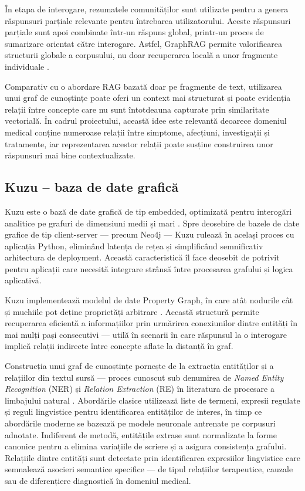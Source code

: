 \documentclass[12pt, a4paper, oneside, romanian]{teza-upb}
\begin{document}
În etapa de interogare, rezumatele comunităților sunt utilizate pentru a genera răspunsuri parțiale relevante pentru întrebarea utilizatorului. Aceste răspunsuri parțiale sunt apoi combinate într-un răspuns global, printr-un proces de sumarizare orientat către interogare. Astfel, GraphRAG permite valorificarea structurii globale a corpusului, nu doar recuperarea locală a unor fragmente individuale \cite{edge2024local}.

Comparativ cu o abordare RAG bazată doar pe fragmente de text, utilizarea unui graf de cunoștințe poate oferi un context mai structurat și poate evidenția relații între concepte care nu sunt întotdeauna capturate prin similaritate vectorială. În cadrul proiectului, această idee este relevantă deoarece domeniul medical conține numeroase relații între simptome, afecțiuni, investigații și tratamente, iar reprezentarea acestor relații poate susține construirea unor răspunsuri mai bine contextualizate.

\subsection{Kuzu -- baza de date grafică}

Kuzu este o bază de date grafică de tip embedded, optimizată pentru interogări analitice pe grafuri de dimensiuni medii și mari \cite{kuzu_doc}. Spre deosebire de bazele de date grafice de tip client-server — precum Neo4j — Kuzu rulează în același proces cu aplicația Python, eliminând latența de rețea și simplificând semnificativ arhitectura de deployment. Această caracteristică îl face deosebit de potrivit pentru aplicații care necesită integrare strânsă între procesarea grafului și logica aplicativă.


Kuzu implementează modelul de date Property Graph, în care atât nodurile cât 
și muchiile pot deține proprietăți arbitrare \cite{kuzu_doc, kuzu_cidr}. 
Această structură permite recuperarea eficientă a informațiilor prin urmărirea 
conexiunilor dintre entități în mai mulți pași consecutivi — utilă în scenarii 
în care răspunsul la o interogare implică relații indirecte între concepte 
aflate la distanță în graf.


Construcția unui graf de cunoștințe pornește de la extracția entităților și a 
relațiilor din textul sursă — proces cunoscut sub denumirea de 
\textit{Named Entity Recognition} (NER) și \textit{Relation Extraction} (RE) 
în literatura de procesare a limbajului natural \cite{jurafsky2023}. Abordările 
clasice utilizează liste de termeni, expresii regulate și reguli lingvistice 
pentru identificarea entităților de interes, în timp ce abordările moderne 
se bazează pe modele neuronale antrenate pe corpusuri adnotate. Indiferent de 
metodă, entitățile extrase sunt normalizate la forme canonice pentru a elimina 
variațiile de scriere și a asigura consistența grafului. Relațiile dintre 
entități sunt detectate prin identificarea expresiilor lingvistice care 
semnalează asocieri semantice specifice — de tipul relațiilor terapeutice, 
cauzale sau de diferențiere diagnostică în domeniul medical.
\end{document}
